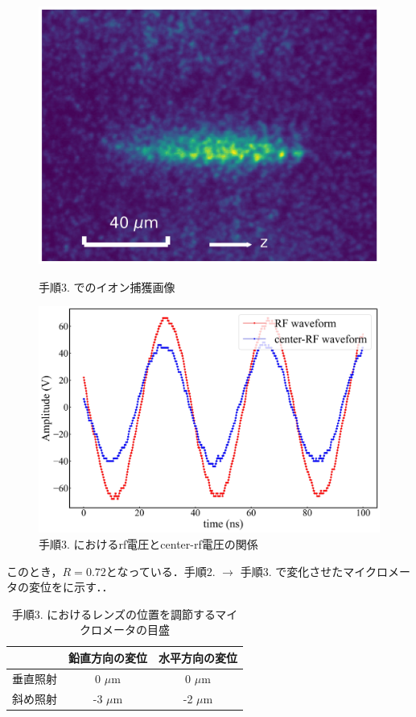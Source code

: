 \begin{enumerate}
\begin{figure}[h]
	\begin{minipage}{0.48\linewidth}
	\begin{center}
		\includegraphics[width = 0.6\columnwidth]{./methods/figure/3_2D.jpg}
		\caption{手順3. でのイオン捕獲画像}
		\label{fig:3_2D}
	\end{center}
	\end{minipage}
	\begin{minipage}{0.48\linewidth}
		\begin{center}
			\includegraphics[width = 0.9\columnwidth]{./methods/figure/3_2D_wave.jpg}
			\caption{手順3. におけるrf電圧とcenter-rf電圧の関係}
			\label{fig:3_2D_wave}
		\end{center}
	\end{minipage}
\end{figure}

このとき，$R=0.72$となっている．手順2. $\rightarrow$ 手順3. で変化させたマイクロメータの変位をに示す．．

\begin{table}[h]
\begin{center}
	\caption{手順3. におけるレンズの位置を調節するマイクロメータの目盛}
	\label{tab:3_2D}
	\begin{tabular}{c|cc} \hline \hline
		&鉛直方向の変位&水平方向の変位 \\ \hline
		垂直照射&0 $\mu$m & 0 $\mu$m \\ 
		斜め照射&-3 $\mu$m & -2 $\mu$m \\ \hline
	\end{tabular}
\end{center}
\end{table}


\end{enumerate}
